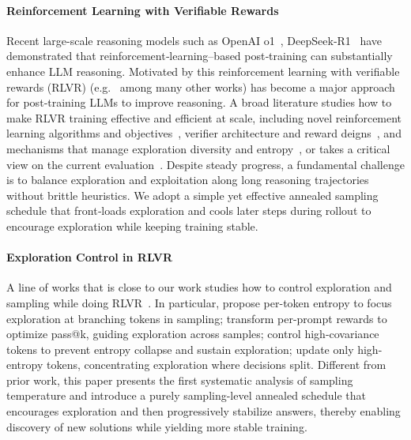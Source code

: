 \documentclass{article} %
\begin{document}
\paragraph{Reinforcement Learning with Verifiable Rewards}  Recent large-scale reasoning models such as OpenAI o1~\citep{openai2024learning}, DeepSeek‑R1~\citep{guo2025deepseek} have demonstrated that reinforcement‑learning–based post‑training can substantially enhance LLM reasoning. Motivated by this reinforcement learning with verifiable rewards (RLVR) (e.g.~\citet{shao2024deepseekmath,guo2025deepseek,lambert2024tulu,yang2025qwen3,hu2025open,yu2025dapo,guan2025rstar,zeng2025simplerl} among many other works) has become a major approach for post‑training LLMs to improve reasoning. A broad literature studies how to make RLVR training effective and efficient at scale, including novel reinforcement learning algorithms and objectives~\citep{yu2025dapo,liu2025understanding,yue2025vapo,zheng2025group}, verifier architecture and reward deigns~\citep{zuo2025ttrl,zhao2025learning,agarwal2025unreasonable,prabhudesai2025maximizing}, and mechanisms that manage exploration diversity and entropy~\citep{cheng2025reasoning,chen2025pass,cui2025entropy,wang2025beyond}, or takes a critical view on the current evaluation~\citep{yue2025does,zhao2025echo,hochlehnert2025sober}. Despite steady progress, a fundamental challenge is to balance exploration and exploitation along long reasoning trajectories without brittle heuristics. We adopt a simple yet effective annealed sampling schedule that front‑loads exploration and cools later steps during rollout to encourage exploration while keeping training stable.

\paragraph{Exploration Control in RLVR} A line of works that is close to our work studies how to control exploration and sampling while doing RLVR~\citep{cheng2025reasoning,chen2025pass,cui2025entropy,wang2025beyond,xiong2025minimalist,deng2025trial,xu2025not,zheng2025act,dou2025improving}. In particular, \citet{cheng2025reasoning} propose per-token entropy to focus exploration at branching tokens in sampling; \citet{chen2025pass} transform per-prompt rewards to optimize pass@k, guiding exploration across samples; \citet{cui2025entropy} control high-covariance tokens to prevent entropy collapse and sustain exploration; \citet{wang2025beyond} update only high-entropy tokens, concentrating exploration where decisions split. Different from prior work, this paper presents the first systematic analysis of sampling temperature and introduce a purely sampling-level annealed schedule that encourages exploration and then progressively stabilize answers, thereby enabling discovery of new solutions while yielding more stable training.
\end{document}
